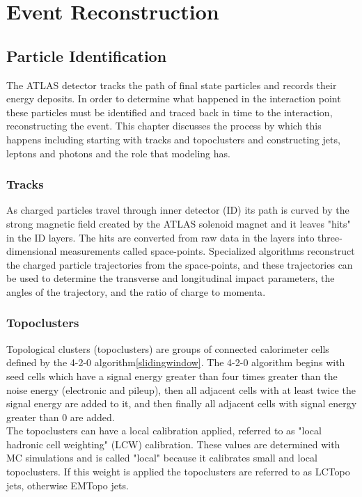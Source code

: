 \chapter{Event Reconstruction}
\label{ch:combinedPerformance}
\section{Particle Identification}

The ATLAS detector tracks the path of final state particles and records their energy deposits.  In order to determine what happened in the interaction point these particles must be identified and traced back in time to the interaction, reconstructing the event.  This chapter discusses the process by which this happens including starting with tracks and topoclusters and constructing jets, leptons and photons and the role that modeling has.

\subsection{Tracks}

As charged particles travel through inner detector (ID) its path is curved by the strong magnetic field created by the ATLAS solenoid magnet and it leaves "hits" in the ID layers.  The hits are converted from raw data in the layers into three-dimensional measurements called space-points.  Specialized algorithms reconstruct the charged particle trajectories from the space-points, and these trajectories can be used to determine the transverse and longitudinal impact parameters, the angles of the trajectory, and the ratio of charge to momenta\cite{ATL-PHYS-PUB-2015-006}.  


\subsection{Topoclusters}

Topological clusters (topoclusters) are groups of connected calorimeter cells defined by the 4-2-0 algorithm\ref{slidingwindow}.  The 4-2-0 algorithm begins with seed cells which have a signal energy greater than four times greater than the noise energy (electronic and pileup), then all adjacent cells with at least twice the signal energy are added to it, and then finally all adjacent cells with signal energy greater than 0 are added.  \\

The topoclusters can have a local calibration applied, referred to as "local hadronic cell weighting" (LCW) calibration.  These values are determined with MC simulations and is called "local" because it calibrates small and local topoclusters.  If this weight is applied the topoclusters are referred to as LCTopo jets, otherwise EMTopo jets. \\

